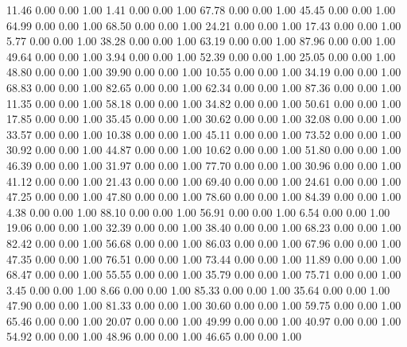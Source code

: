    11.46   0.00   0.00   1.00
    1.41   0.00   0.00   1.00
   67.78   0.00   0.00   1.00
   45.45   0.00   0.00   1.00
   64.99   0.00   0.00   1.00
   68.50   0.00   0.00   1.00
   24.21   0.00   0.00   1.00
   17.43   0.00   0.00   1.00
    5.77   0.00   0.00   1.00
   38.28   0.00   0.00   1.00
   63.19   0.00   0.00   1.00
   87.96   0.00   0.00   1.00
   49.64   0.00   0.00   1.00
    3.94   0.00   0.00   1.00
   52.39   0.00   0.00   1.00
   25.05   0.00   0.00   1.00
   48.80   0.00   0.00   1.00
   39.90   0.00   0.00   1.00
   10.55   0.00   0.00   1.00
   34.19   0.00   0.00   1.00
   68.83   0.00   0.00   1.00
   82.65   0.00   0.00   1.00
   62.34   0.00   0.00   1.00
   87.36   0.00   0.00   1.00
   11.35   0.00   0.00   1.00
   58.18   0.00   0.00   1.00
   34.82   0.00   0.00   1.00
   50.61   0.00   0.00   1.00
   17.85   0.00   0.00   1.00
   35.45   0.00   0.00   1.00
   30.62   0.00   0.00   1.00
   32.08   0.00   0.00   1.00
   33.57   0.00   0.00   1.00
   10.38   0.00   0.00   1.00
   45.11   0.00   0.00   1.00
   73.52   0.00   0.00   1.00
   30.92   0.00   0.00   1.00
   44.87   0.00   0.00   1.00
   10.62   0.00   0.00   1.00
   51.80   0.00   0.00   1.00
   46.39   0.00   0.00   1.00
   31.97   0.00   0.00   1.00
   77.70   0.00   0.00   1.00
   30.96   0.00   0.00   1.00
   41.12   0.00   0.00   1.00
   21.43   0.00   0.00   1.00
   69.40   0.00   0.00   1.00
   24.61   0.00   0.00   1.00
   47.25   0.00   0.00   1.00
   47.80   0.00   0.00   1.00
   78.60   0.00   0.00   1.00
   84.39   0.00   0.00   1.00
    4.38   0.00   0.00   1.00
   88.10   0.00   0.00   1.00
   56.91   0.00   0.00   1.00
    6.54   0.00   0.00   1.00
   19.06   0.00   0.00   1.00
   32.39   0.00   0.00   1.00
   38.40   0.00   0.00   1.00
   68.23   0.00   0.00   1.00
   82.42   0.00   0.00   1.00
   56.68   0.00   0.00   1.00
   86.03   0.00   0.00   1.00
   67.96   0.00   0.00   1.00
   47.35   0.00   0.00   1.00
   76.51   0.00   0.00   1.00
   73.44   0.00   0.00   1.00
   11.89   0.00   0.00   1.00
   68.47   0.00   0.00   1.00
   55.55   0.00   0.00   1.00
   35.79   0.00   0.00   1.00
   75.71   0.00   0.00   1.00
    3.45   0.00   0.00   1.00
    8.66   0.00   0.00   1.00
   85.33   0.00   0.00   1.00
   35.64   0.00   0.00   1.00
   47.90   0.00   0.00   1.00
   81.33   0.00   0.00   1.00
   30.60   0.00   0.00   1.00
   59.75   0.00   0.00   1.00
   65.46   0.00   0.00   1.00
   20.07   0.00   0.00   1.00
   49.99   0.00   0.00   1.00
   40.97   0.00   0.00   1.00
   54.92   0.00   0.00   1.00
   48.96   0.00   0.00   1.00
   46.65   0.00   0.00   1.00
